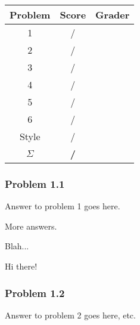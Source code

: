 \documentclass[12pt,letterpaper]{article}
\newcommand\hwnum{1}                  %
\newenvironment{answer}[1]{
  \subsubsection*{Problem \hwnum.#1}
}{}
\begin{document}
\begin{center}
	\begin{tabular}{|c|c|c|}
		\hline
		\textbf{Problem} & \textbf{Score} & \textbf{Grader} \\\hline
		1 & / & ~ \quad\quad\\
		2 & / & ~ \quad\quad\\
		3 & / & ~ \quad\quad\\
		4 & / & ~ \quad\quad\\
		5 & / & ~ \quad\quad\\
		6 & / & ~ \quad\quad\\
		Style & / & ~ \quad\quad\\\hline
		$\Sigma$ & \textbf{/} & ~ \\
		\hline
	\end{tabular}
\end{center}

\begin{answer}{1}
Answer to problem 1 goes here.

More answers.

Blah...

Hi there!
\end{answer}

\begin{answer}{2}
Answer to problem 2 goes here, etc.
\end{answer}
\end{document}
